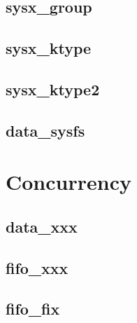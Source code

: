 \documentclass{article}
\begin{document}
\subsection{sysx\_group}
\subsection{sysx\_ktype}
\subsection{sysx\_ktype2}
\subsection{data\_sysfs}

\section{Concurrency}
\subsection{data\_xxx}
\subsection{fifo\_xxx}
\subsection{fifo\_fix}

\pagebreak
\printbibliography

\end{document}

